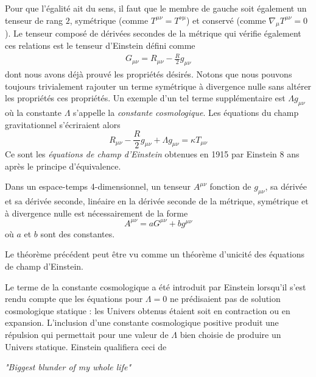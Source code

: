 Pour que l'égalité ait du sens, il faut que le membre de gauche soit également un tenseur de rang $2$, symétrique (comme $T^{\mu\nu} = T^{\nu\mu}$) et conservé (comme $\nabla_\mu T^{\mu\nu} = 0$). Le tenseur composé de dérivées secondes de la métrique qui vérifie également ces relations est le tenseur d'Einstein défini comme
\begin{align}
    G_{\mu \nu} = R_{\mu \nu} - \frac{R}{2}g_{\mu \nu}
\end{align}
dont nous avons déjà prouvé les propriétés désirés. Notons que nous pouvons toujours trivialement rajouter un terme symétrique à divergence nulle sans altérer les propriétés ces propriétés. Un exemple d'un tel terme supplémentaire est $\Lambda g_{\mu\nu}$ où la constante $\Lambda$ s'appelle la \emph{constante cosmologique}. Les équations du champ gravitationnel s'écriraient alors
\begin{equation}
    \label{eq: einstein FE}
    \boxed{R_{\mu\nu} - \frac{R}{2} g_{\mu\nu} + \Lambda g_{\mu\nu} = \kappa T_{\mu\nu}}
\end{equation}
Ce sont les \emph{équations de champ d'Einstein} obtenues en 1915 par Einstein 8 ans après le principe d'équivalence.
\begin{theoremframe}
    \begin{theorem}[de Lovelock]
        Dans un espace-temps 4-dimensionnel, un tenseur $A^{\mu\nu}$ fonction de $g_{\mu \nu}$, sa dérivée et sa dérivée seconde, linéaire en la dérivée seconde de la métrique, symétrique et à divergence nulle est nécessairement de la forme
        \begin{equation}
            A^{\mu\nu} = a G^{\mu\nu} + b g^{\mu\nu}
        \end{equation}
        où $a$ et $b$ sont des constantes.
    \end{theorem}
\end{theoremframe}
\begin{rmk}
    Le théorème précédent peut être vu comme un théorème d'unicité des équations de champ d'Einstein. 
\end{rmk}
Le terme de la constante cosmologique a été introduit par Einstein lorsqu'il s'est rendu compte que les équations pour $\Lambda = 0$ ne prédisaient pas de solution cosmologique statique : les Univers obtenus étaient soit en contraction ou en expansion. L'inclusion d'une constante cosmologique positive produit une répulsion qui permettait pour une valeur de $\Lambda$ bien choisie de produire un Univers statique. Einstein qualifiera ceci de 
\begin{center}
    \emph{"Biggest blunder of my whole life"}
\end{center}
